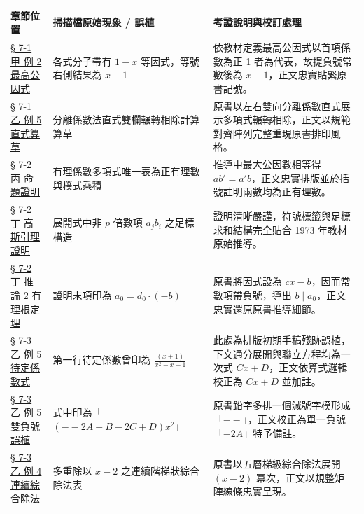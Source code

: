\documentclass[a4paper,12pt,twoside]{article}
\begin{document}
\begin{table}[H]
\centering
\small
\renewcommand{\arraystretch}{1.35}
\begin{tabularx}{\textwidth}{|p{3.2cm}|p{3.8cm}|X|}
\hline
\textbf{章節位置} & \textbf{掃描檔原始現象 / 誤植} & \textbf{考證說明與校訂處理} \\ \hline

\hyperref[subsec:7-1-a]{§ 7-1 甲 例 2 最高公因式} & 
各式分子帶有 $1-x$ 等因式，等號右側結果為 $x-1$ & 
依教材定義最高公因式以首項係數為正 1 者為代表，故提負號常數後為 $x-1$，正文忠實貼緊原書記號。 \\ \hline

\hyperref[subsec:7-1-b]{§ 7-1 乙 例 5 直式算草} & 
分離係數法直式雙欄輾轉相除計算算草 & 
原書以左右雙向分離係數直式展示多項式輾轉相除，正文以規範對齊陣列完整重現原書排印風格。 \\ \hline

\hyperref[prop:primitive_unique]{§ 7-2 丙 命題證明} & 
有理係數多項式唯一表為正有理數與樸式乘積 & 
推導中最大公因數相等得 $ab'=a'b$，正文忠實排版並於括號註明兩數均為正有理數。 \\ \hline

\hyperref[lem:gauss]{§ 7-2 丁 高斯引理證明} & 
展開式中非 $p$ 倍數項 $a_j b_i$ 之足標構造 & 
證明清晰嚴謹，符號標籤與足標求和結構完全貼合 1973 年教材原始推導。 \\ \hline

\hyperref[cor:rational_root]{§ 7-2 丁 推論 2 有理根定理} & 
證明末項印為 $a_0 = d_0 \cdot (-b)$ & 
原書將因式設為 $cx-b$，因而常數項帶負號，導出 $b \mid a_0$，正文忠實還原原書推導細節。 \\ \hline

\hyperref[note:ch7-cx-plus-d]{§ 7-3 乙 例 5 待定係數式} & 
第一行待定係數曾印為 $\frac{(x+1)}{x^2-x+1}$ & 
此處為排版初期手稿殘跡誤植，下文通分展開與聯立方程均為一次式 $Cx+D$，正文依算式邏輯校正為 $Cx+D$ 並加註。 \\ \hline

\hyperref[note:ch7-double-minus]{§ 7-3 乙 例 5 雙負號誤植} & 
式中印為「$(--2A+B-2C+D)x^2$」 & 
原書鉛字多排一個減號字模形成「$--$」，正文校正為單一負號「$-2A$」特予備註。 \\ \hline

\hyperref[subsec:7-3-b]{§ 7-3 乙 例 4 連續綜合除法} & 
多重除以 $x-2$ 之連續階梯狀綜合除法表 & 
原書以五層梯級綜合除法展開 $(x-2)$ 冪次，正文以規整矩陣線條忠實呈現。 \\ \hline

\end{tabularx}
\end{table}

\clearpage
\tableofcontents
\newpage


\end{document}
